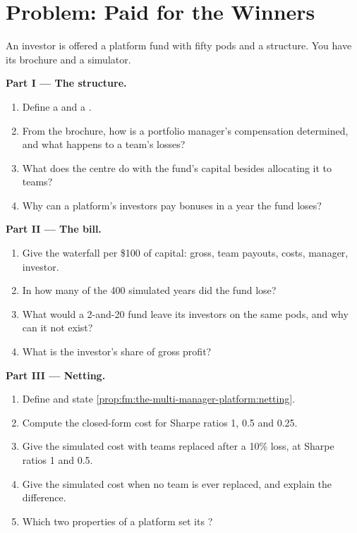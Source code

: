 \section{Problem: Paid for the Winners}

\begin{problem}\label{pb:fm:the-multi-manager-platform:1}
An investor is offered a platform fund with fifty pods and a  structure. You have its brochure and a simulator.

\medskip\noindent\textbf{Part I --- The structure.}
\begin{enumerate}
\item Define a  and a .
\item From the brochure, how is a portfolio manager's compensation determined, and what happens to a team's losses?
\item What does the centre do with the fund's capital besides allocating it to teams?
\item Why can a platform's investors pay bonuses in a year the fund loses?
\end{enumerate}

\medskip\noindent\textbf{Part II --- The bill.}
\begin{enumerate}[resume]
\item Give the waterfall per \$100 of capital: gross, team payouts, costs, manager, investor.
\item In how many of the 400 simulated years did the fund lose?
\item What would a 2-and-20 fund leave its investors on the same pods, and why can it not exist?
\item What is the investor's share of gross profit?
\end{enumerate}

\medskip\noindent\textbf{Part III --- Netting.}
\begin{enumerate}[resume]
\item Define  and state \cref{prop:fm:the-multi-manager-platform:netting}.
\item Compute the closed-form cost for Sharpe ratios 1, 0.5 and 0.25.
\item Give the simulated cost with teams replaced after a 10\% loss, at Sharpe ratios 1 and 0.5.
\item Give the simulated cost when no team is ever replaced, and explain the difference.
\item Which two properties of a platform set its ?
\end{enumerate}


\end{problem}
